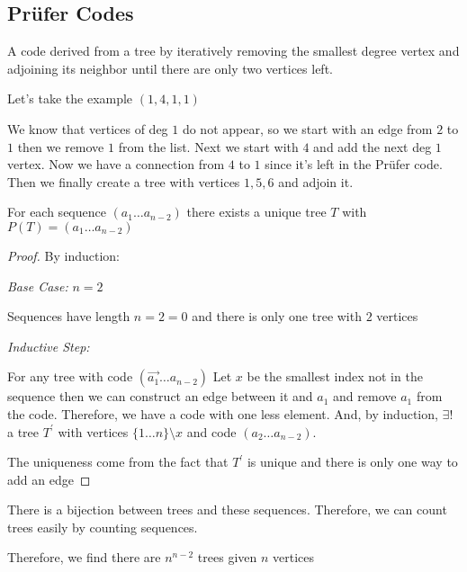 
\subsection{Prüfer Codes}
\begin{definition}
    \label{def:prüfer code}
    A code derived from a tree by iteratively removing the smallest degree vertex and adjoining its neighbor until there are only two vertices left.
\end{definition}

\begin{example}
    \label{ex:prufer code to tree}
    Let's take the example \((1,4,1,1)\)

    We know that vertices of deg \(1\) do not appear, so we start with an edge from \(2\) to \(1\)  then we remove \(1\) from the list. Next we start with \(4\) and add the next deg \(1\) vertex. Now we have a connection from \(4\) to \(1\) since it's left in the Prüfer code. Then we finally create a tree with vertices \(1,5,6\) and adjoin it.
\end{example} 

\begin{theorem}
    For each sequence \((a_1 \ldots a_{n-2})\) there exists a unique tree \(T\) with \(P(T) = (a_1 \ldots a_{n-2})\)
\end{theorem}
\begin{proof}
    By induction:
    
    \emph{Base Case:} \(n = 2\)

    Sequences have length \(n = 2 = 0\) and there is only one tree with \(2\) vertices

    \emph{Inductive Step:}

    For any tree with code \((\vec{a_1} \ldots a_{n-2})\) Let \(x\) be the smallest index not in the sequence then we can construct an edge between it and \(a_1\) and remove \(a_1\) from the code. Therefore, we have a code with one less element. And, by induction, \(\exists !\) a tree \(T^\prime\) with vertices \(\{1\ldots n\}\setminus{x}\)  and code \((a_2 \ldots a_{n-2})\).

    The uniqueness come from the fact that \(T^\prime\) is unique and there is only one way to add an edge
\end{proof}
\begin{theorem}[Cayley]
    \label{thm:cayley}
    There is a bijection between trees and these sequences. Therefore, we can count trees easily by counting sequences.

    Therefore, we find there are \(n^{n-2}\) trees given \(n\) vertices
\end{theorem} 